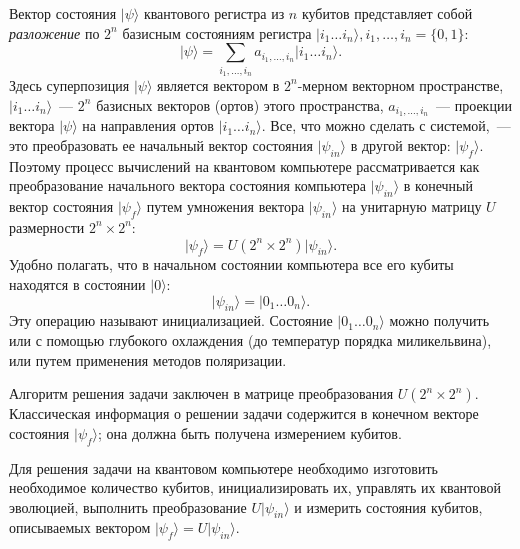 \begin{multicols}{2}
{        Вектор состояния $\vert\psi\rangle$ квантового регистра из $n$ кубитов
        представляет собой \emph{разложение} по $2^n$ базисным состояниям регистра $\vert i_1 \ldots i_n \rangle, i_1, \ldots, i_n = \{0, 1\}:$
        \begin{equation}
            \vert\psi\rangle=\sum\limits_{i_1,\ldots,i_n}a_{i_1,\ldots,i_n}\vert i_1\ldots i_n\rangle.
        \end{equation}
        Здесь суперпозиция $\vert\psi\rangle$ является вектором в $2^n$-мерном векторном пространстве, \(\vert i_1\ldots i_n\rangle\)~--- $2^n$ базисных векторов (ортов) этого пространства, $a_{i_1,\ldots,i_n}$~--- проекции вектора $\vert\psi\rangle$ на направления ортов $\vert i_1 \ldots i_n \rangle$.
    Все, что можно сделать с системой,~--- это преобразовать ее начальный вектор состояния $\vert\psi_{in}\rangle$ в другой вектор: $\vert\psi_f\rangle$. Поэтому процесс вычислений на квантовом компьютере рассматривается как преобразование начального вектора состояния компьютера $\vert\psi_{in}\rangle$ в конечный вектор состояния $\vert\psi_f\rangle$ путем умножения вектора $\vert\psi_{in}\rangle$ на унитарную матрицу $U$ размерности $2^n \times 2^n$:
    \begin{equation}
        \vert\psi_f\rangle=U(2^n\times 2^n)\vert\psi_{in}\rangle.
    \end{equation}
    Удобно полагать, что в начальном состоянии компьютера все его кубиты находятся в состоянии $\vert0\rangle$:
    \begin{equation}
        \vert\psi_{in}\rangle=\vert0_1\ldots 0_n\rangle.
    \end{equation}
    Эту операцию называют инициализацией. Состояние $\vert0_1\ldots 0_n\rangle$ можно получить или с помощью глубокого охлаждения (до температур порядка миликельвина), или путем применения методов поляризации.
    
    Алгоритм решения задачи заключен в матрице преобразования $U(2^n\times 2^n).$ Классическая информация о решении задачи содержится в конечном векторе состояния $\vert\psi_f\rangle$; она должна быть получена измерением кубитов.
    
    Для решения задачи на квантовом компьютере необходимо изготовить необходимое количество кубитов, инициализировать их, управлять их квантовой эволюцией, выполнить преобразование $U\vert\psi_{in}\rangle$ и измерить состояния кубитов, описываемых вектором $\vert\psi_f\rangle=U\vert\psi_{in}\rangle.$
    }\\

\end{multicols}
